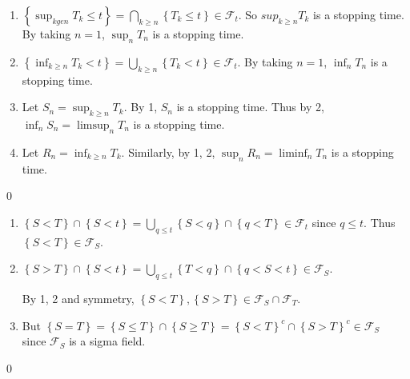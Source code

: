 \begin{problem}[7.3.3] \hfill

	\begin{enumerate}
		\item $\left\{ \sup_{k ge n} T_k \le t \right\} = \bigcap_{k \ge n}\left\{ T_k \le t \right\} \in \mathcal{F}_t$. So $sup_{k \ge n} T_k$ is a stopping time.  By taking $n=1$, $\sup_n T_n$ is a stopping time.

		\item $\left\{ \inf_{k\ge n} T_k < t \right\} = \bigcup_{k \ge n} \left\{ T_k < t \right\} \in \mathcal{F}_t$. By taking $n=1$, $\inf_n T_n$ is a stopping time.

		\item Let $S_n = \sup_{k\ge n} T_k$.
			By 1, $S_n$ is a stopping time.
			Thus by 2, $\inf_n S_n = \limsup_n T_n$ is a stopping time.

		\item Let $R_n = \inf_{k \ge n}T_k$.
			Similarly, by 1, 2, $\sup_n R_n = \liminf_n T_n$ is a stopping time.
	\end{enumerate}
	
	\qed
\end{problem}

\begin{problem}[7.3.5] \hfill

	\begin{enumerate}
		\item $\left\{ S< T \right\} \cap \left\{ S < t \right\} = \bigcup_{q \le t} \left\{ S< q \right\} \cap \left\{ q < T \right\} \in \mathcal{F}_t$ since $q\le t$.
			Thus $\left\{ S<T \right \} \in \mathcal{F}_S$.

		\item $\left\{ S > T \right\} \cap \left\{ S < t \right\} = \bigcup_{q \le t } \left\{ T < q \right\} \cap \left\{ q < S < t \right\} \in \mathcal{F}_S$.

			By 1, 2 and symmetry, $\left\{ S<T \right\}, \left\{ S>T \right\} \in \mathcal{F}_S \cap \mathcal{F}_T$.

		\item But $\left\{ S = T \right\} = \left\{ S \le T \right\} \cap \left\{ S \ge T \right\} = \left\{ S < T \right\}^c \cap \left\{ S > T \right\}^c \in \mathcal{F}_S$ since $\mathcal{F}_S$ is a sigma field.
	\end{enumerate}

	\qed
\end{problem}
